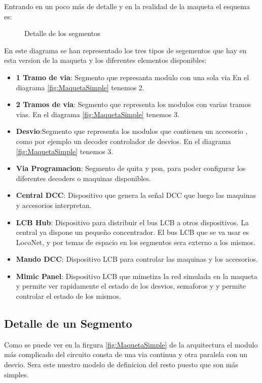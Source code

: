 
Entrando en un poco más de detalle y en la realidad de la maqueta
el esquema es:

\begin{figure}[H]
    \centering
    
    \caption{Detalle de los segmentos}
    \label{fig:SegmentosDetail}
\end{figure}
En este diagrama se han representado los tres tipos de segementos que hay
en esta version de la maqueta y los diferentes elementos disponibles:
\begin{itemize}
    \item \textbf{1 Tramo de via}: Segmento que represanta modulo con una sola via
En el diagrama \ref{fig:MaquetaSimple} tenemos 2.
    \item \textbf{2 Tramos de via}: Segmento que representa los modulos con varias
tramos vias. En el diagrama \ref{fig:MaquetaSimple} tenemos 3.
    \item \textbf{Desvio}:Segmento que representa los modulos que contienen un accesorio
, como por ejemplo un decoder controlador de desvios. En el diagrama \ref{fig:MaquetaSimple} tenemos 3.
    \item \textbf{Via Programacion}: Segmento de quita y pon, para poder
configurar los diferentes decoders o maquinas disponibles.
    \item \textbf{Central DCC}: Dispositivo que genera la señal DCC
que luego las maquinas y accesorios interpretan.
    \item \textbf{LCB Hub}: Dispositivo para distribuir el bus 
LCB a otros dispositivos. La central ya dispone un pequeño concentrador.
El bus LCB que se va usar es LocoNet, y por temas de espacio en los segmentos
sera externo a los mismos.
    \item \textbf{Mando DCC}: Dispositivo LCB para controlar las maquinas
y los accesorios.
    \item \textbf{Mimic Panel}: Dispositivo LCB que mimetiza la red simulada
en la maqueta y permite ver rapidamente el estado de los desvios, semaforos y
y permite controlar el estado de los mismos.
\end{itemize}

\subsection{Detalle de un Segmento}
Como se puede ver en la firgura \ref{fig:MaquetaSimple} de la arquitectura el modulo más complicado
del circuito consta de una via continua y otra paralela con un desvio. Sera este nuestro modelo de
definicion del resto puesto que son más simples.

